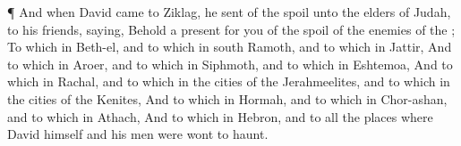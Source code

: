{\par }{\PP {}¶ And when
David
came to
Ziklag, he
sent of the
spoil unto the
elders of
Judah,
{} to his
friends,
saying, Behold a
present for you of the
spoil of the
enemies of the
{};
To
{} which
{} in
Beth-el, and to
{} which
{} in
south
Ramoth, and to
{} which
{} in
Jattir,
And to
{} which
{} in
Aroer, and to
{} which
{} in
Siphmoth, and to
{} which
{} in
Eshtemoa,
And to
{} which
{} in
Rachal, and to
{} which
{} in the
cities of the
Jerahmeelites, and to
{} which
{} in the
cities of the
Kenites,
And to
{} which
{} in
Hormah, and to
{} which
{} in
Chor-ashan, and to
{} which
{} in
Athach,
And to
{} which
{} in
Hebron, and to all the
places where
David himself and his
men were wont to
haunt.

}
